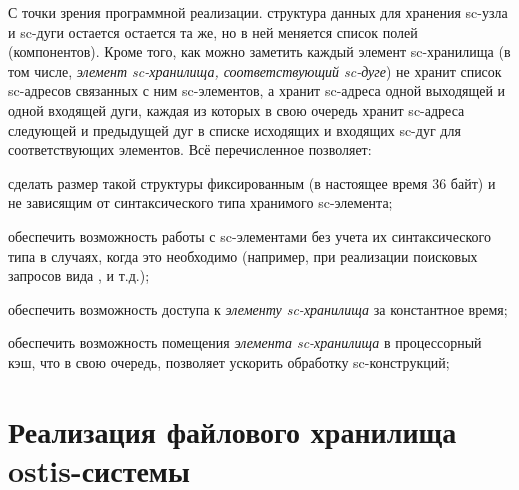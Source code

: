 С точки зрения программной реализации. структура данных для хранения sc-узла и sc-дуги остается остается та же, но в ней меняется список полей (компонентов). Кроме того, как можно заметить каждый элемент sc-хранилища (в том числе, \textit{элемент sc-хранилища, соответствующий sc-дуге}) не хранит список sc-адресов связанных с ним sc-элементов, а хранит sc-адреса одной выходящей и одной входящей дуги, каждая из которых в свою очередь хранит sc-адреса следующей и предыдущей дуг в списке исходящих и входящих sc-дуг для соответствующих элементов. Всё перечисленное позволяет:

\begin{textitemize}
    \item сделать размер такой структуры фиксированным (в настоящее время 36 байт) и не зависящим от синтаксического типа хранимого sc-элемента;
    \item обеспечить возможность работы с sc-элементами без учета их синтаксического типа в случаях, когда это необходимо (например, при реализации поисковых запросов вида ,  и т.д.);
    \item обеспечить возможность доступа к \textit{элементу sc-хранилища} за константное время;
    \item обеспечить возможность помещения \textit{элемента sc-хранилища} в процессорный кэш, что в свою очередь, позволяет ускорить обработку sc-конструкций;
\end{textitemize}

\section{Реализация файлового хранилища ostis-системы}
\label{sec_soft_platform_file_storage}

